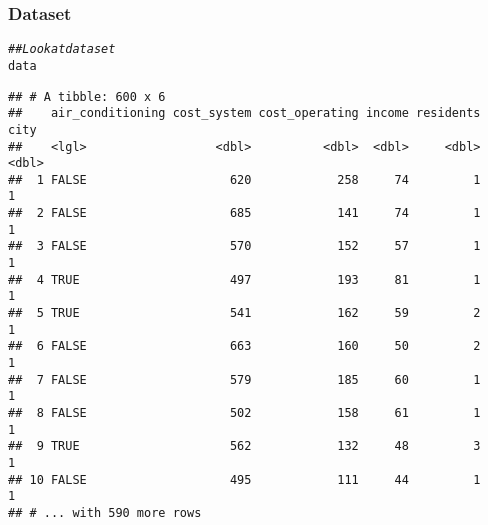 \documentclass{beamer}\usepackage[]{graphicx}\usepackage[]{color}
\makeatletter
\newcommand{\hlcom}[1]{\textcolor[rgb]{0.678,0.584,0.686}{\textit{#1}}}%
\newcommand{\hlopt}[1]{\textcolor[rgb]{0,0,0}{#1}}%
\newcommand{\hlstd}[1]{\textcolor[rgb]{0.345,0.345,0.345}{#1}}%
\newcommand{\hlkwb}[1]{\textcolor[rgb]{0.69,0.353,0.396}{#1}}%
\newcommand{\hlkwc}[1]{\textcolor[rgb]{0.333,0.667,0.333}{#1}}%
\newcommand{\hlkwd}[1]{\textcolor[rgb]{0.737,0.353,0.396}{\textbf{#1}}}%
\newenvironment{kframe}{%
 \def\at@end@of@kframe{}%
 \ifinner\ifhmode%
  \def\at@end@of@kframe{\end{minipage}}%
  \begin{minipage}{\columnwidth}%
 \fi\fi%
 \def\FrameCommand##1{\hskip\@totalleftmargin \hskip-\fboxsep
 \colorbox{shadecolor}{##1}\hskip-\fboxsep
     \hskip-\linewidth \hskip-\@totalleftmargin \hskip\columnwidth}%
 \MakeFramed {\advance\hsize-\width
   \@totalleftmargin\z@ \linewidth\hsize
   \@setminipage}}%
 {\par\unskip\endMakeFramed%
 \at@end@of@kframe}
\newenvironment{knitrout}{}{} %
\makeatother
\begin{document}
\begin{frame}[fragile]\frametitle{Dataset}
\begin{knitrout}\footnotesize
{}\color{fgcolor}\begin{kframe}
\begin{alltt}
\hlcom{## Look at dataset}
\hlstd{data}
\end{alltt}
\begin{verbatim}
## # A tibble: 600 x 6
##    air_conditioning cost_system cost_operating income residents  city
##    <lgl>                  <dbl>          <dbl>  <dbl>     <dbl> <dbl>
##  1 FALSE                    620            258     74         1     1
##  2 FALSE                    685            141     74         1     1
##  3 FALSE                    570            152     57         1     1
##  4 TRUE                     497            193     81         1     1
##  5 TRUE                     541            162     59         2     1
##  6 FALSE                    663            160     50         2     1
##  7 FALSE                    579            185     60         1     1
##  8 FALSE                    502            158     61         1     1
##  9 TRUE                     562            132     48         3     1
## 10 FALSE                    495            111     44         1     1
## # ... with 590 more rows
\end{verbatim}
\end{kframe}
\end{knitrout}
\end{frame}

\end{document}

